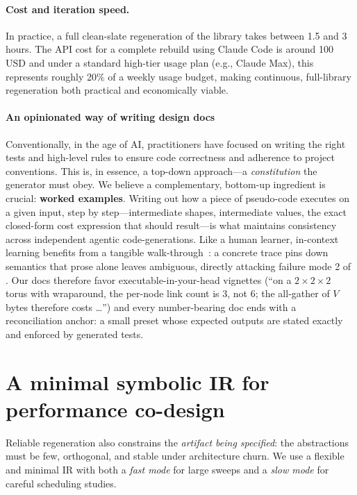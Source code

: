 \documentclass{article}
\begin{document}
\paragraph{Cost and iteration speed.}
In practice, a full clean-slate regeneration of the library takes between 1.5
and 3 hours. The API cost for a complete rebuild using Claude Code is around 100 USD and under a standard high-tier usage plan (e.g., Claude Max), this represents
roughly 20\% of a weekly usage budget, making continuous, full-library
regeneration both practical and economically viable.

\paragraph{An opinionated way of writing design docs}
\label{sec:writing}

Conventionally, in the age of AI, practitioners have focused on writing the
right tests and high-level rules to ensure code correctness and adherence to
project conventions. This is, in essence, a top-down approach---a
\emph{constitution} the generator must obey. We believe a complementary,
bottom-up ingredient is crucial: \textbf{worked examples}. Writing out how a
piece of pseudo-code executes on a given input, step by step---intermediate
shapes, intermediate values, the exact closed-form cost expression that should
result---is what maintains consistency across independent agentic
code-generations. Like a human learner, in-context learning benefits from a
tangible walk-through~\citep{brown2020language,dong2022survey}: a concrete trace pins down
semantics that prose alone leaves ambiguous, directly attacking failure mode 2
of . Our docs therefore favor executable-in-your-head vignettes
(``on a $2{\times}2{\times}2$ torus with wraparound, the per-node link count is
3, not 6; the all-gather of $V$ bytes therefore costs \ldots'') and every number-bearing doc ends with a reconciliation anchor: a small preset whose expected outputs are stated exactly and enforced
by generated tests.

\section{A minimal symbolic IR for performance co-design}
\label{sec:ir}

Reliable regeneration also constrains the \emph{artifact being specified}: the
abstractions must be few, orthogonal, and stable under architecture churn. We
use a flexible and minimal IR with both a \emph{fast mode} for large sweeps
and a \emph{slow mode} for careful scheduling studies.
\end{document}
